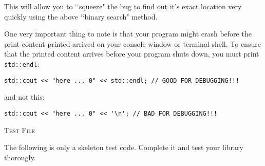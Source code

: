 This will allow you to \lq\lq squeeze" the bug to find out it's exact location 
very quickly using the above \lq\lq binary search" method.

One very important thing to note is that your program might crash before the 
print content printed arrived on your console window or terminal shell. To 
ensure that the printed content arrives before your program shuts down, you 
must print \verb!std::endl!:
\begin{Verbatim}[frame=single,fontsize=\small]
std::cout << "here ... 0" << std::endl; // GOOD FOR DEBUGGING!!!
\end{Verbatim}

and not this:
\begin{Verbatim}[frame=single,fontsize=\small]
std::cout << "here ... 0" << '\n'; // BAD FOR DEBUGGING!!!
\end{Verbatim}


\newpage
\textsc{Test File}

The following is only a skeleton test code. Complete it and test your library thorougly.

